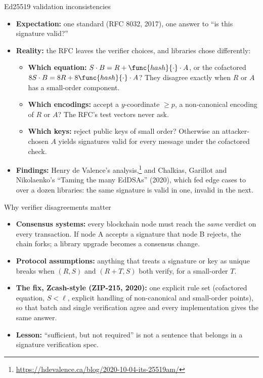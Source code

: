 \ifdefined\PRESENTATION\else\PassOptionsToClass{handout}{beamer}\fi\documentclass[aspectratio=169, lualatex]{beamer}
\begin{document}
\begin{frame}{Ed25519 validation inconsistencies}
	\begin{itemize}
		\item \textbf{Expectation:} one standard (RFC 8032, 2017), one answer to ``is this signature valid?''
		\item \textbf{Reality:} the RFC leaves the verifier choices, and libraries chose differently:
		      \begin{itemize}
			      \item \textbf{Which equation:} $S \cdot B = R + \func{hash}{\cdot} \cdot A$, or the cofactored $8S \cdot B = 8R + 8\func{hash}{\cdot} \cdot A$? They disagree exactly when $R$ or $A$ has a small-order component.
			      \item \textbf{Which encodings:} accept a $y$-coordinate $\geq p$, a non-canonical encoding of $R$ or $A$? The RFC's test vectors never ask.
			      \item \textbf{Which keys:} reject public keys of small order? Otherwise an attacker-chosen $A$ yields signatures valid for every message under the cofactored check.
		      \end{itemize}
		\item \textbf{Findings:} Henry de Valence's analysis,\footnote{\url{https://hdevalence.ca/blog/2020-10-04-its-25519am/}} and Chalkias, Garillot and Nikolaenko's ``Taming the many EdDSAs'' (2020), which fed edge cases to over a dozen libraries: the same signature is valid in one, invalid in the next.
	\end{itemize}
\end{frame}

\begin{frame}{Why verifier disagreements matter}
	\begin{itemize}
		\item \textbf{Consensus systems:} every blockchain node must reach the \emph{same} verdict on every transaction. If node A accepts a signature that node B rejects, the chain forks; a library upgrade becomes a consensus change.
		\item \textbf{Protocol assumptions:} anything that treats a signature or key as unique breaks when $(R, S)$ and $(R + T, S)$ both verify, for a small-order $T$.
		\item \textbf{The fix, Zcash-style (ZIP-215, 2020):} one explicit rule set (cofactored equation, $S < \ell$, explicit handling of non-canonical and small-order points), so that batch and single verification agree and every implementation gives the same answer.
		\item \textbf{Lesson:} ``sufficient, but not required'' is not a sentence that belongs in a signature verification spec.
	\end{itemize}
\end{frame}
\end{document}

